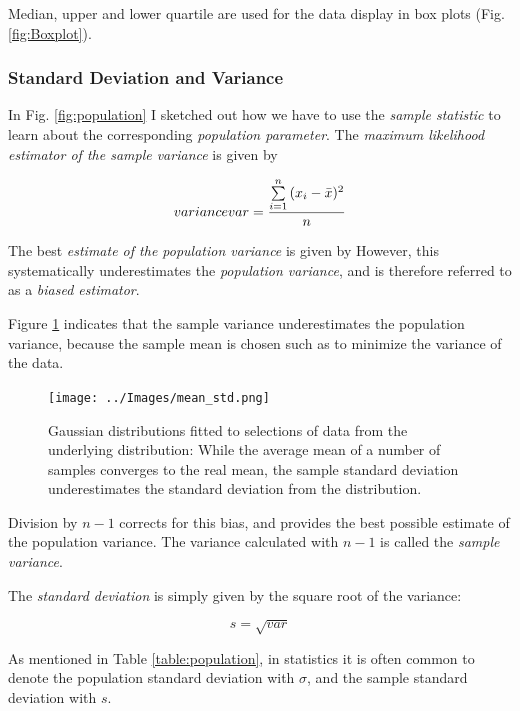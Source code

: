 Median, upper and lower quartile are used for the data display in box plots (Fig.\ref{fig:Boxplot}).

\subsubsection{Standard Deviation and Variance}

In Fig. \ref{fig:population} I sketched out how we have to use the \emph{sample statistic} to learn about the corresponding \emph{population parameter}.
The \emph{maximum likelihood estimator of the sample variance} is given by

\begin{equation}\label{eq_variance} \index{general}{variance}
  var = \frac{{\sum\limits_{i = 1}^n {({x_i-\bar{x}})^2} }}{n}
\end{equation}

The best \emph{estimate of the population variance} is given by
However, this systematically underestimates the \emph{population variance}, and is therefore referred to as a \emph{biased estimator}.

Figure \ref{fig:mean_std} indicates that the sample variance underestimates the population variance, because the sample mean is chosen such as to minimize the variance of the data.

\begin{figure}[ht]
  \centering
  \texttt{[image: ../Images/mean\_std.png]}\\
  \caption{Gaussian distributions fitted to selections of data from the underlying distribution: While the average mean of a number of samples converges to the real mean, the sample standard deviation underestimates the standard deviation from the distribution.}\label{fig:mean_std}
\end{figure}

Division by $n-1$ corrects for this bias, and provides the best possible estimate of the population variance. The variance calculated with $n-1$ is called the \emph{sample variance}.


The \emph{standard deviation}  is simply given by the square root of the variance:

\begin{equation}
  s = \sqrt{var}
\end{equation}

As mentioned in Table \ref{table:population}, in statistics it is often common to denote the population standard deviation with $\sigma$, and the sample standard deviation with $s$.

